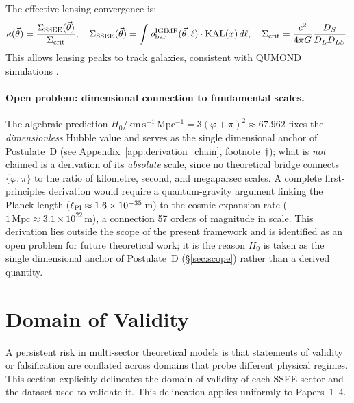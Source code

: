 \documentclass[12pt,a4paper]{article}
\newcommand{\SSEE}{\ifmmode\mathrm{SSEE}\else\textsc{ssee}\fi}
\newcommand{\kmsu}{\mathrm{km\,s^{-1}\,Mpc^{-1}}}
\begin{document}
The effective lensing convergence is:
\begin{equation}
  \kappa(\vec{\theta})
  = \frac{\Sigma_{\SSEE}(\vec{\theta})}{\Sigma_{\rm crit}},
  \quad
  \Sigma_{\SSEE}(\vec{\theta})
  = \int \rho_{\rm bar}^{\rm IGIMF}(\vec{\theta},\ell)\cdot\mathrm{KAL}(x)\,d\ell,
  \quad
  \Sigma_{\rm crit} = \frac{c^2}{4\pi G}\frac{D_S}{D_L D_{LS}}.
\end{equation}
This allows lensing peaks to track galaxies, consistent with QUMOND simulations
\citep{Angus2007}.

\paragraph{Open problem: dimensional connection to fundamental scales.}
The algebraic prediction $H_0/\kmsu = 3(\varphi+\pi)^2 \approx 67.962$
fixes the \emph{dimensionless} Hubble value and serves as the single dimensional
anchor of Postulate~D (see Appendix~\ref{app:derivation_chain}, footnote~$\dagger$);
what is \emph{not} claimed is a derivation of its \emph{absolute} scale, since no
theoretical bridge connects $\{\varphi,\pi\}$ to the ratio of kilometre, second, and
megaparsec scales.  A complete first-principles
derivation would require a quantum-gravity argument linking the Planck length
($\ell_{\rm Pl}\approx1.6\times10^{-35}$\,m) to the cosmic expansion rate
($1\,\mathrm{Mpc}\approx3.1\times10^{22}$\,m), a connection 57 orders of magnitude
in scale.  This derivation lies outside the scope of the present framework and
is identified as an open problem for future theoretical work; it is the reason
$H_0$ is taken as the single dimensional anchor of Postulate~D
(\S\ref{sec:scope}) rather than a derived quantity.

\section{Domain of Validity}
\label{sec:domain}

A persistent risk in multi-sector theoretical models is that statements of
validity or falsification are conflated across domains that probe different
physical regimes. This section explicitly delineates the domain of validity
of each SSEE sector and the dataset used to validate it. This delineation
applies uniformly to Papers~1--4.
\end{document}
